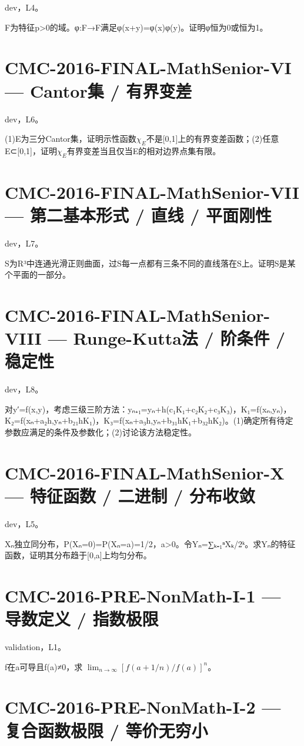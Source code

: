 \documentclass[UTF8]{ctexart}
\begin{document}
dev，L4。

F为特征p>0的域。φ:F→F满足φ(x+y)=φ(x)φ(y)。证明φ恒为0或恒为1。

\section*{CMC-2016-FINAL-MathSenior-VI — Cantor集 / 有界变差}

dev，L6。

(1)E为三分Cantor集，证明示性函数$χ_E$不是[0,1]上的有界变差函数；(2)任意E⊂[0,1]，证明$χ_E$有界变差当且仅当E的相对边界点集有限。

\section*{CMC-2016-FINAL-MathSenior-VII — 第二基本形式 / 直线 / 平面刚性}

dev，L7。

S为R³中连通光滑正则曲面，过S每一点都有三条不同的直线落在S上。证明S是某个平面的一部分。

\section*{CMC-2016-FINAL-MathSenior-VIII — Runge-Kutta法 / 阶条件 / 稳定性}

dev，L8。

对y′=f(x,y)，考虑三级三阶方法：yₙ₊₁=yₙ+h(c₁K₁+c₂K₂+c₃K₃)，K₁=f(xₙ,yₙ)，K₂=f(xₙ+a₂h,yₙ+b₂₁hK₁)，K₃=f(xₙ+a₃h,yₙ+b₃₁hK₁+b₃₂hK₂)。(1)确定所有待定参数应满足的条件及参数化；(2)讨论该方法稳定性。

\section*{CMC-2016-FINAL-MathSenior-X — 特征函数 / 二进制 / 分布收敛}

dev，L5。

Xₙ独立同分布，P(Xₙ=0)=P(Xₙ=a)=1/2，a>0。令Yₙ=∑ₖ₌₁ⁿXₖ/2ᵏ。求Yₙ的特征函数，证明其分布趋于[0,a]上均匀分布。

\section*{CMC-2016-PRE-NonMath-I-1 — 导数定义 / 指数极限}

validation，L1。

f在a可导且f(a)≠0，求 $\lim_{n\to\infty}[f(a+1/n)/f(a)]^n$。

\section*{CMC-2016-PRE-NonMath-I-2 — 复合函数极限 / 等价无穷小}
\end{document}
